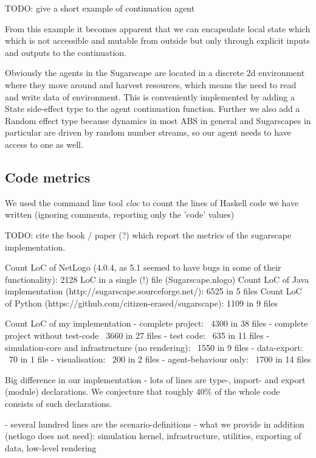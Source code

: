 \begin{HaskellCode}
TODO: give a short example of continuation agent
\end{HaskellCode}

From this example it becomes apparent that we can encapsulate local state which which is not accessible and mutable from outside but only through explicit inputs and outputs to the continuation.

Obviously the agents in the Sugarscape are located in a discrete 2d environment where they move around and harvest resources, which means the need to read and write data of environment. This is conveniently implemented by adding a State side-effect type to the agent continuation function. Further we also add a Random effect type because dynamics in most ABS in general and Sugarscapes in particular are driven by random number streams, so our agent needs to have access to one as well.

\subsection{Code metrics}
We used the command line tool \textit{cloc} to count the lines of Haskell code we have written (ignoring comments, reporting only the 'code' values)

TODO: cite the book / paper  (?) which report the metrics of the sugarscape implementation.

Count LoC of NetLogo (4.0.4, as 5.1 seemed to have bugs in some of their functionality): 2128 LoC in a single (!) file (Sugarscape.nlogo)
Count LoC of Java implementation (http://sugarscape.sourceforge.net/): 6525 in 5 files
Count LoC of Python (https://github.com/citizen-erased/sugarscape): 1109 in 9 files

Count LoC of my implementation
- complete project: ~4300 in 38 files
- complete project without test-code ~3660 in 27 files
- test code: ~635 in 11 files
- simulation-core and infrastructure (no rendering): ~1550 in 9 files
- data-export: ~70 in 1 file
- visualisation: ~200 in 2 files
- agent-behaviour only: ~1700 in 14 files

Big difference in our implementation
- lots of lines are type-, import- and export (module) declarations. We conjecture that roughly 40\% of the whole code consists of such declarations.

- several hundred lines are the scenario-definitions
- what we provide in addition (netlogo does not need): simulation kernel, infrastructure, utilities, exporting of data, low-level rendering

